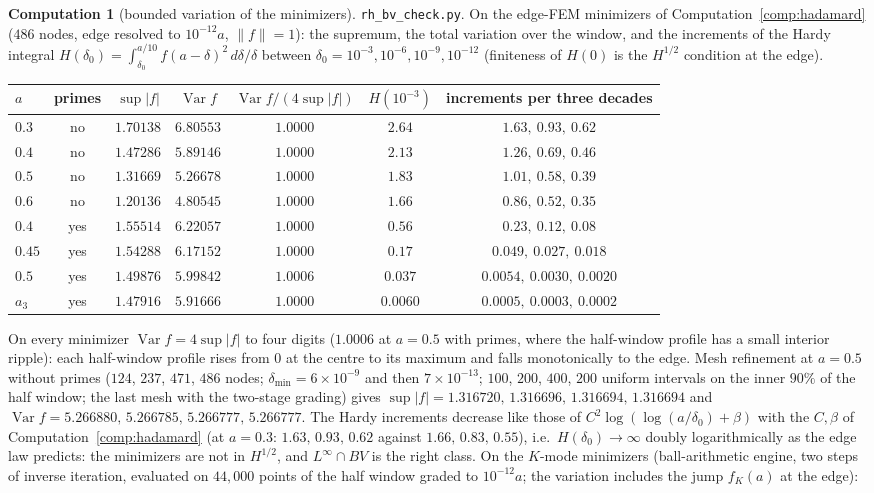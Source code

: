 \documentclass[11pt]{article}
\theoremstyle{definition}
\newtheorem{computation}[theorem]{Computation}
\theoremstyle{remark}
\begin{document}
\begin{computation}[bounded variation of the minimizers]\label{comp:bv}
\texttt{rh\_bv\_check.py}. On the edge-FEM minimizers of Computation~\ref{comp:hadamard} ($486$ nodes, edge resolved to $10^{-12}a$, $\|f\|=1$): the supremum, the total variation over the window, and the increments of the Hardy integral $H(\delta_0)=\int_{\delta_0}^{a/10}f(a-\delta)^2\,d\delta/\delta$ between $\delta_0=10^{-3},10^{-6},10^{-9},10^{-12}$ (finiteness of $H(0)$ is the $H^{1/2}$ condition at the edge).
\begin{center}
\begin{tabular}{@{}lcccccc@{}}
\toprule
$a$ & primes & $\sup|f|$ & $\operatorname{Var}f$ & $\operatorname{Var}f/(4\sup|f|)$ & $H(10^{-3})$ & increments per three decades\\
\midrule
$0.3$ & no & $1.70138$ & $6.80553$ & $1.0000$ & $2.64$ & $1.63,\ 0.93,\ 0.62$\\
$0.4$ & no & $1.47286$ & $5.89146$ & $1.0000$ & $2.13$ & $1.26,\ 0.69,\ 0.46$\\
$0.5$ & no & $1.31669$ & $5.26678$ & $1.0000$ & $1.83$ & $1.01,\ 0.58,\ 0.39$\\
$0.6$ & no & $1.20136$ & $4.80545$ & $1.0000$ & $1.66$ & $0.86,\ 0.52,\ 0.35$\\
$0.4$ & yes & $1.55514$ & $6.22057$ & $1.0000$ & $0.56$ & $0.23,\ 0.12,\ 0.08$\\
$0.45$ & yes & $1.54288$ & $6.17152$ & $1.0000$ & $0.17$ & $0.049,\ 0.027,\ 0.018$\\
$0.5$ & yes & $1.49876$ & $5.99842$ & $1.0006$ & $0.037$ & $0.0054,\ 0.0030,\ 0.0020$\\
$a_3$ & yes & $1.47916$ & $5.91666$ & $1.0000$ & $0.0060$ & $0.0005,\ 0.0003,\ 0.0002$\\
\bottomrule
\end{tabular}
\end{center}
On every minimizer $\operatorname{Var}f=4\sup|f|$ to four digits ($1.0006$ at $a=0.5$ with primes, where the half-window profile has a small interior ripple): each half-window profile rises from $0$ at the centre to its maximum and falls monotonically to the edge. Mesh refinement at $a=0.5$ without primes ($124$, $237$, $471$, $486$ nodes; $\delta_{\min}=6\times10^{-9}$ and then $7\times10^{-13}$; $100$, $200$, $400$, $200$ uniform intervals on the inner $90\%$ of the half window; the last mesh with the two-stage grading) gives $\sup|f|=1.316720,\,1.316696,\,1.316694,\,1.316694$ and $\operatorname{Var}f=5.266880,\,5.266785,\,5.266777,\,5.266777$. The Hardy increments decrease like those of $C^2\log(\log(a/\delta_0)+\beta)$ with the $C,\beta$ of Computation~\ref{comp:hadamard} (at $a=0.3$: $1.63,\,0.93,\,0.62$ against $1.66,\,0.83,\,0.55$), i.e.\ $H(\delta_0)\to\infty$ doubly logarithmically as the edge law predicts: the minimizers are not in $H^{1/2}$, and $L^\infty\cap BV$ is the right class. On the $K$-mode minimizers (ball-arithmetic engine, two steps of inverse iteration, evaluated on $44{,}000$ points of the half window graded to $10^{-12}a$; the variation includes the jump $f_K(a)$ at the edge):

\end{computation}
\end{document}
